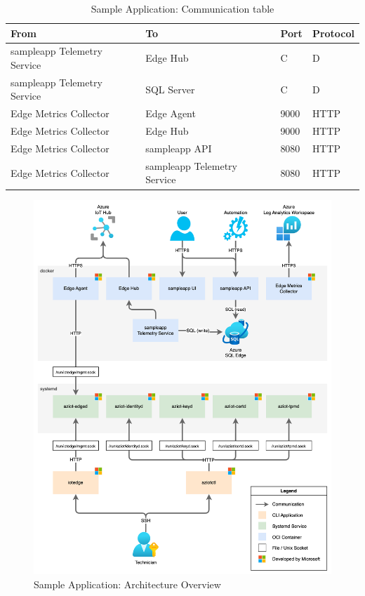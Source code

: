 \begin{table}[H]
    \centering
    \begin{tabular}{l l l l }
        \toprule
        \textbf{From} & \textbf{To} & \textbf{Port} & \textbf{Protocol} \\
        \midrule
        sampleapp Telemetry Service & Edge Hub & C & D \\
        sampleapp Telemetry Service & SQL Server & C & D \\
        Edge Metrics Collector & Edge Agent & 9000 & \ac{HTTP} \\
        Edge Metrics Collector & Edge Hub & 9000 & \ac{HTTP} \\
        Edge Metrics Collector & sampleapp API & 8080 & \ac{HTTP} \\
        Edge Metrics Collector & sampleapp Telemetry Service & 8080 & \ac{HTTP} \\
        \bottomrule
    \end{tabular}
    \caption{Sample Application: Communication table}
\end{table}


\begin{figure}[H]
    \includegraphics[width=\textwidth]{fig/sample-app-dataflow.drawio.png}
    \caption{Sample Application: Architecture Overview}
    \label{fig:sample-app-architecture}
\end{figure}

